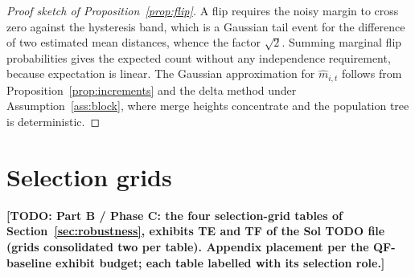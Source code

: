 \documentclass[11pt]{article}
\theoremstyle{remark}
\newcommand{\TODO}[1]{\textbf{[TODO: #1]}}
\begin{document}
\begin{proof}[Proof sketch of Proposition~\ref{prop:flip}]
A flip requires the noisy margin to cross zero against the hysteresis band,
which is a Gaussian tail event for the difference of two estimated mean
distances, whence the factor $\sqrt{2}$. Summing marginal flip probabilities
gives the expected count without any independence requirement, because
expectation is linear. The Gaussian approximation for $\widehat{m}_{i,t}$
follows from Proposition~\ref{prop:increments} and the delta method under
Assumption~\ref{ass:block}, where merge heights concentrate and the population
tree is deterministic.
\end{proof}

\section{Selection grids}
\label{app:robustness}

\TODO{Part B / Phase C: the four selection-grid tables of
Section~\ref{sec:robustness}, exhibits TE and TF of the Sol TODO file (grids
consolidated two per table). Appendix placement per the QF-baseline exhibit
budget; each table labelled with its selection role.}



\end{document}

